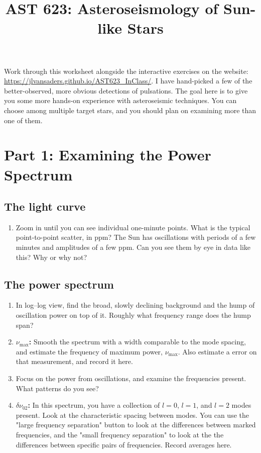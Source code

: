 \documentclass[11pt]{article}
\title{\textbf{AST 623: Asteroseismology of Sun-like Stars}}
\author{}
\date{}
\newcommand{\numax}{\ensuremath{\nu_\mathrm{max}}}
\newcommand{\dnuzt}{\ensuremath{\delta\nu_{02}}}
\newcommand{\answer}[1][3cm]{\par\vspace{#1}}
\begin{document}
\maketitle
\vspace{-3em}

Work through this worksheet alongside the interactive exercises on the website: 
\url{https://jlvansaders.github.io/AST623_InClass/}. I have hand-picked a few of the better-observed, more obvious detections of pulsations. The goal here is to give you some more hands-on experience with asteroseismic techniques. You can choose among multiple target stars, and you should plan on examining more than one of them. 
\section*{Part 1: Examining the Power Spectrum}

\subsection*{The light curve}

\begin{enumerate}[series=ps]
  \item Zoom in until you can see individual one-minute points. What is the typical
        point-to-point scatter, in ppm? The Sun has oscillations with periods of a few minutes and amplitudes of a few ppm.
        Can you see them by eye in data like this? Why or why not?
        \answer[2cm]
\end{enumerate}

\subsection*{The power spectrum}

\begin{enumerate}[resume=ps]
  \item In log--log view, find the broad, slowly declining background and the hump of
        oscillation power on top of it. Roughly what frequency range does the hump span?
        \answer[2cm]
  \item \textbf{\numax:} Smooth the spectrum with a width comparable to the mode spacing, and estimate the frequency of maximum power, \numax. Also estimate a error on that measurement, and record it here. 
        \answer[1cm]
  \item Focus on the power from oscillations, and examine the frequencies present. What patterns do you see?
        \answer[2.5cm]
  \item \textbf{\dnuzt:} In this spectrum, you have a collection of $l=0$, $l=1$, and $l=2$ modes present. Look at the characteristic spacing between modes. You can use the "large frequency separation" button to look at the differences between marked frequencies, and the "small frequency separation" to look at the the differences between specific pairs of frequencies.  Record averages here. 
        \answer[1cm]
\end{enumerate}
\end{document}
